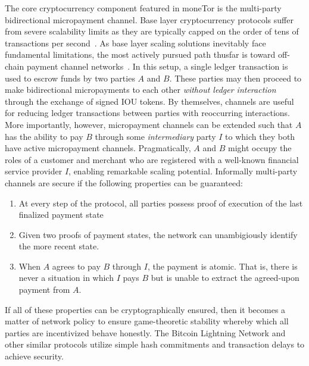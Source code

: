 The core cryptocurrency component featured in moneTor is the multi-party
bidirectional micropayment channel. Base layer cryptocurrency protocols suffer
from severe scalability limits as they are typically capped on the order of tens
of transactions per second~\cite{team2018blockchain}. As base layer scaling
solutions inevitably face fundamental limitations, the most actively pursued
path thusfar is toward off-chain payment channel
networks~\cite{poon2016bitcoin}. In this setup, a single ledger transaction is
used to escrow funds by two parties $A$ and $B$. These parties may then proceed
to make bidirectional micropayments to each other \emph{without ledger
  interaction} through the exchange of signed IOU tokens. By themselves,
channels are useful for reducing ledger transactions between parties with
reoccurring interactions. More importantly, however, micropayment channels can
be extended such that $A$ has the ability to pay $B$ through some
\emph{intermediary} party $I$ to which they both have active micropayment
channels. Pragmatically, $A$ and $B$ might occupy the roles of a customer and
merchant who are registered with a well-known financial service provider $I$,
enabling remarkable scaling potential. Informally multi-party channels are
secure if the following properties can be guaranteed:

\begin{enumerate}
\item At every step of the protocol, all parties possess proof of execution of
  the last finalized payment state
\item Given two proofs of payment states, the network can unambigiously identify
  the more recent state.
\item When $A$ agrees to pay $B$ through $I$, the payment is atomic. That is,
  there is never a situation in which $I$ pays $B$ but is unable to extract the
  agreed-upon payment from $A$.
\end{enumerate}

If all of these properties can be cryptographically ensured, then it becomes a
matter of network policy to ensure game-theoretic stability whereby which all
parties are incentivized behave honestly. The Bitcoin Lightning Network and
other similar protocols utilize simple hash commitments and transaction delays
to achieve security.

